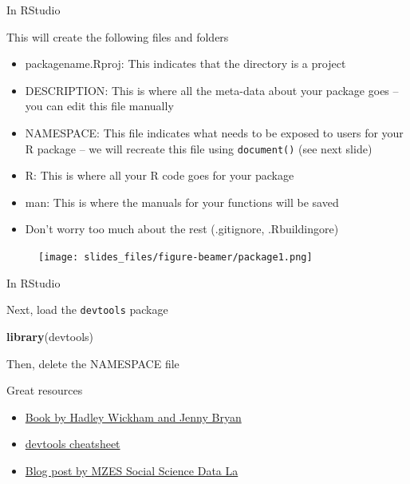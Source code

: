 \documentclass[
  ignorenonframetext,
]{beamer}
\newenvironment{Shaded}{\begin{snugshade}}{\end{snugshade}}
\newcommand{\KeywordTok}[1]{\textcolor[rgb]{0.13,0.29,0.53}{\textbf{#1}}}
\newcommand{\NormalTok}[1]{#1}
\providecommand{\tightlist}{%
  \setlength{\itemsep}{0pt}\setlength{\parskip}{0pt}}
\begin{document}
\begin{frame}[fragile]{In RStudio}
\protect\hypertarget{in-rstudio-1}{}

This will create the following files and folders

\small

\begin{itemize}
\tightlist
\item
  \alert{packagename.Rproj}: This indicates that the directory is a
  project
\item
  \alert{DESCRIPTION}: This is where all the meta-data about your
  package goes -- you can edit this file manually
\item
  \alert{NAMESPACE}: This file indicates what needs to be exposed to
  users for your R package -- we will recreate this file using
  \texttt{document()} (see next slide)
\item
  \alert{R}: This is where all your R code goes for your package
\item
  \alert{man}: This is where the manuals for your functions will be
  saved
\item
  Don't worry too much about the rest (.gitignore, .Rbuildingore)
\end{itemize}

\begin{figure}
  \texttt{[image: slides\_files/figure-beamer/package1.png]}
\end{figure}

\end{frame}

\begin{frame}[fragile]{In RStudio}
\protect\hypertarget{in-rstudio-2}{}

Next, load the \texttt{devtools} package

\begin{Shaded}
\begin{Highlighting}[]
\KeywordTok{library}\NormalTok{(devtools)}
\end{Highlighting}
\end{Shaded}

Then, delete the NAMESPACE file

\end{frame}

\begin{frame}{Great resources}
\protect\hypertarget{great-resources}{}

\begin{itemize}
\tightlist
\item
  \href{https://r-pkgs.org/}{Book by Hadley Wickham and Jenny Bryan}
\item
  \href{https://rstudio.com/wp-content/uploads/2015/03/devtools-cheatsheet.pdf}{devtools
  cheatsheet}
\item
  \href{https://www.mzes.uni-mannheim.de/socialsciencedatalab/article/r-package/}{Blog
  post by MZES Social Science Data La}
\end{itemize}

\end{frame}
\end{document}
